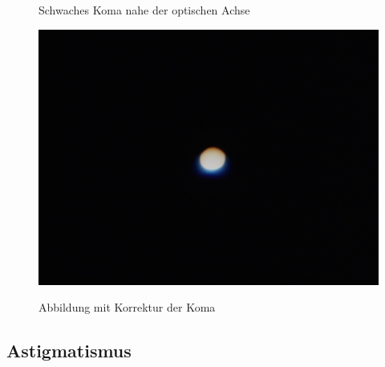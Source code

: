 \begin{figure}[htb]
\begin{minipage}[t]{0.32\textwidth}
		\label{fig:koma_schwach}
		\caption{Schwaches Koma nahe der optischen Achse}
	\end{minipage}
	\hfill
	\begin{minipage}[t]{0.32\textwidth}
		\includegraphics[width=\linewidth]{img/Koma/Prakt_Linsenfehler_2015_06_04_099}
		\label{fig:koma_korrigiert}
		\caption{Abbildung mit Korrektur der Koma}
	\end{minipage}	
\end{figure}

\subsection{Astigmatismus}

